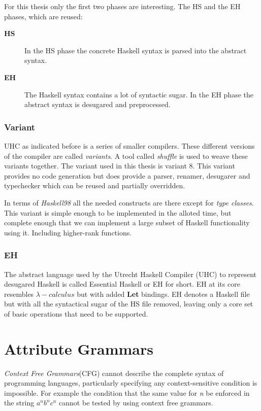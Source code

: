 \documentclass[twoside, titlepage, openright, a4paper]{book}
\begin{document}
For this thesis only the first two phases are interesting. The HS and the EH phases, which are reused:
\begin{description}
\item[\textbf{HS}] In the HS phase the concrete Haskell syntax is parsed into the abstract syntax. 
\item[\textbf{EH}] The Haskell syntax contains a lot of syntactic sugar. In the EH phase the abstract syntax is desugared and preprocessed.
\end{description}
\subsection{Variant}
UHC as indicated before is a series of smaller compilers. These different versions of the compiler are called \emph{variants}. A tool called \emph{shuffle} is used to weave these variants together. The variant used in this thesis is variant 8. This variant provides no code generation but does provide a parser, renamer, desugarer and typechecker which can be reused and partially overridden.

In terms of \emph{Haskell98} all the needed constructs are there except for \emph{type classes}. This variant is simple enough to be implemented in the alloted time, but complete enough that we can implement a large subset of Haskell functionality using it. Including higher-rank functions.

\subsection{EH}
The abstract language used by the Utrecht Haskell Compiler (UHC) to represent desugared Haskell is called Essential Haskell or EH for short. EH at its core resembles $\lambda-calculus$ but with added \textbf{Let} bindings. EH denotes a Haskell file but with all the syntactical sugar of the HS file removed, leaving only a core set of basic operations that need to be supported.

\chapter{Attribute Grammars}
\label{AG}
\emph{Context Free Grammars}(CFG) cannot describe the complete syntax of programming languages\cite{knuth1}, particularly specifying any context-sensitive condition is impossible. For example the condition that the same value for \emph{n} be enforced in the string $a^nb^nc^n$ cannot be tested by using context free grammars\cite{ken}.
\end{document}
